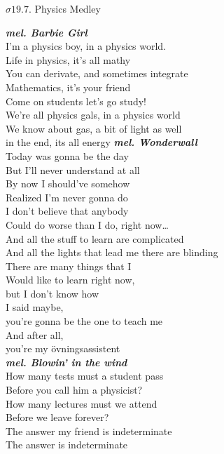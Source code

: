 \documentclass[a6paper,10pt]{article}
\newcommand{\mel}[1]{\small\textbf{\textit{mel. #1 \\}}}
\begin{document}
\begin{center}
\Large $\sigma19.7$. Physics Medley\\
\end{center} \small
\mel{Barbie Girl}
I'm a physics boy, in a physics world.\\
Life in physics, it's all mathy\\
You can derivate, and sometimes integrate\\ 
Mathematics, it's your friend
\vspace{5pt}\\
Come on students let's go study!
\vspace{5pt}\\
We're all physics gals, in a physics world\\
We know about gas, a bit of light as well\\
in the end, its all energy
\setlength{\oddsidemargin}{-0.37in}
\noindent
\mel{Wonderwall}
Today was gonna be the day\\
But I'll never understand at all\\
By now I should've somehow\\
Realized I'm never gonna do\\
I don't believe that anybody\\
Could do worse than I do, right now… 
\vspace{5pt}\\
And all the stuff to learn are complicated\\
And all the lights that lead me there are blinding\\
There are many things that I\\
Would like to learn right now,\\ 
but I don't know how
\vspace{5pt}\\
I said maybe,\\
you're gonna be the one to teach me\\
And after all,\\
you're my övningsassistent 
\vspace{5pt}\\
\mel{Blowin' in the wind}
How many tests must a student pass\\
Before you call him a physicist?\\
How many lectures must we attend\\
Before we leave forever? \\
The answer my friend is indeterminate\\
The answer is indeterminate 
\end{document}
